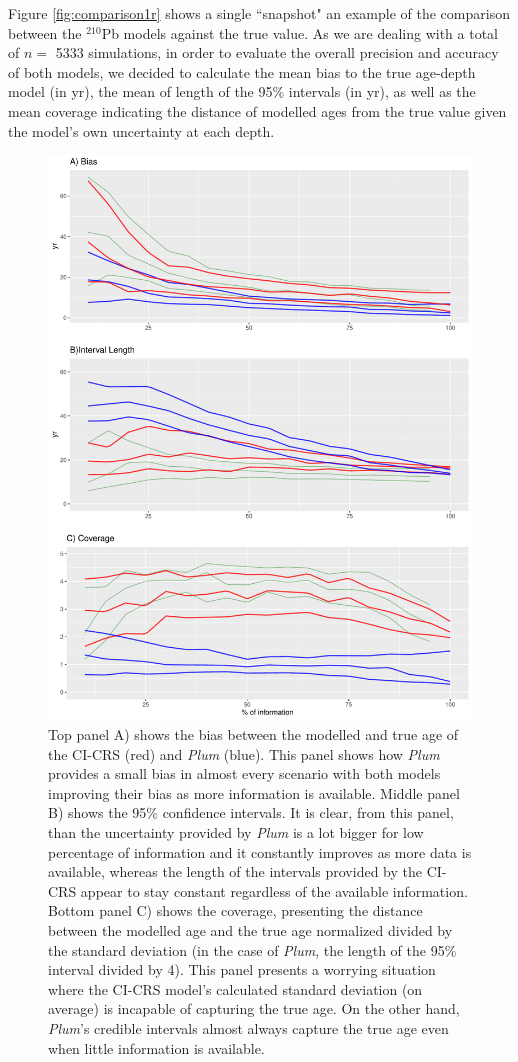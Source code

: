 \documentclass [10pt] {article}
\begin{document}
Figure \ref{fig:comparison1r} shows a single ``snapshot" an example of the comparison between the $^{210}$Pb models against the true value. 
As we are dealing with a total of $n =$ 5333 simulations, in order to evaluate the overall precision and accuracy of both models, we decided to calculate the mean bias to the true age-depth model (in yr), the mean of length of the 95\% intervals (in yr), as well as the mean coverage indicating the distance of modelled ages from the true value given the model's own uncertainty at each depth.  

\begin{figure}[!]
 \centering
  \includegraphics[width=.75\linewidth]{AccPrec.pdf}
	\caption{Top panel A) shows the bias between the modelled and true age of the CI-CRS (red) and \textit{Plum} (blue). This panel shows how \textit{Plum} provides a small bias in almost every scenario with both models improving their bias as more information is available. Middle panel B) shows the 95\% confidence intervals. It is clear, from this panel, than the uncertainty provided by \textit{Plum} is a lot bigger for low percentage of information and it constantly improves as more data is available, whereas the length of the intervals provided by the CI-CRS appear to stay constant regardless of the available information. Bottom panel C) shows the coverage, presenting the distance between the modelled age and the true age normalized divided by the standard deviation (in the case of \textit{Plum}, the length of the 95\% interval divided by 4). This panel presents a worrying situation where the CI-CRS model's calculated standard deviation (on average) is incapable of capturing the true age. On the other hand, \textit{Plum}'s credible intervals almost always capture the true age even when little information is available.}
  \label{fig:accpre}
\end{figure}
\end{document}
